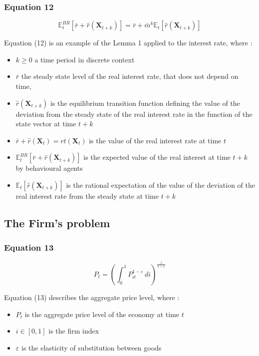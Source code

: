 \documentclass{article}
\begin{document}
\subsubsection*{Equation 12}

\begin{equation}
    \mathbb{E}_{t}^{BR}\left[\bar{r}+\hat{r}\left(\bm{X}_{t+k}\right)\right]=\bar{r}+\bar{m}^{k}\mathbb{E}_{t}\left[\hat{r}(\bm{X}_{t+k})\right]
\end{equation}

Equation (12) is an example of the Lemma 1 applied to the interest rate, where :
\begin{itemize}
    \item $k\geq 0$ a time period in discrete context
    \item $\bar{r}$ the steady state level of the real interest rate, that does not depend on time,  
    \item $\hat{r}(\bm{X}_{t+k})$ is the equilibrium transition function defining the value of the deviation from the steady state of the real interest rate in the function of the state vector at time $t+k$
    \item $\bar{r}+\hat{r}(\bm{X}_{t})=r{t}(\bm{X}_{t})$ is the value of the real interest rate at time $t$
    \item $\mathbb{E}_{t}^{BR}\left[\bar{r}+\hat{r}(\bm{X}_{t+k})\right]$ is the expected value of the real interest at time $t+k$ by behavioural agents
    \item $\mathbb{E}_{t}\left[\hat{r}(\bm{X}_{t+k})\right]$ is the rational expectation of the value of the deviation of the real interest rate from the steady state at time $t+k$
\end{itemize}

\subsection{The Firm's problem}

\subsubsection*{Equation 13}
\begin{equation}
    P_{t}=\left(\int_{0}^{1}P_{it}^{1-\varepsilon}\,di\right)^{\frac{1}{1-\varepsilon}}
\end{equation}

Equation (13) describes the aggregate price level, where : 
\begin{itemize}
    \item $P_{t}$ is the aggregate price level of the economy at time $t$
    \item $i\in\left[0,1\right]$ is the firm index
    \item $\varepsilon$ is the elasticity of substitution between goods
\end{itemize}
\end{document}
